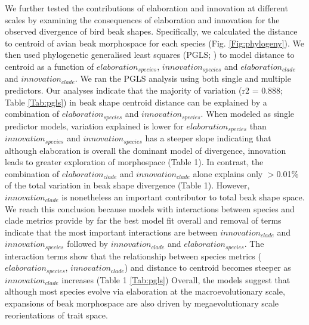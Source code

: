 \documentclass[12pt,letterpaper]{article}
\begin{document}
We further tested the contributions of elaboration and innovation at different scales by examining the consequences of elaboration and innovation for the observed divergence of bird beak shapes.
Specifically, we calculated the distance to centroid of avian beak morphospace for each species (Fig. \ref{Fig:phylogeny}).
We then used phylogenetic generalised least squares (PGLS; \cite{phylom}) to model distance to centroid as a function of $elaboration_{species}$, $innovation_{species}$ and $elaboration_{clade}$ and $innovation_{clade}$.
We ran the PGLS analysis using both single and multiple predictors.
Our analyses indicate that the majority of variation (r2 = 0.888; Table \ref{Tab:pgls}) in beak shape centroid distance can be explained by a combination of $elaboration_{species}$ and $innovation_{species}$.
When modeled as single predictor models, variation explained is lower for $elaboration_{species}$ than $innovation_{species}$ and $innovation_{species}$ has a steeper slope indicating that although elaboration is overall the dominant model of divergence, innovation leads to greater exploration of morphospace (Table 1).
In contrast, the combination of $elaboration_{clade}$ and $innovation_{clade}$ alone explains only $>$0.01\% of the total variation in beak shape divergence (Table 1).
However, $innovation_{clade}$ is nonetheless an important contributor to total beak shape space.
We reach this conclusion because models with interactions between species and clade metrics provide by far the best model fit overall and removal of terms indicate that the most important interactions are between $innovation_{clade}$  and $innovation_{species}$ followed by $innovation_{clade}$ and $elaboration_{species}$.
The interaction terms show that the relationship between species metrics ($elaboration_{species}$, $innovation_{clade}$) and distance to centroid becomes steeper as $innovation_{clade}$ increases (Table 1 \ref{Tab:pgls})
Overall, the models suggest that although most species evolve via elaboration at the macroevolutionary scale, expansions of beak morphospace are also driven by megaevolutionary scale reorientations of trait space. %
\end{document}
